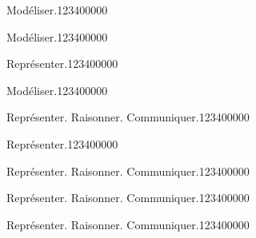 \begin{pageAD}
\begin{ExoCad}{Modéliser.}{1234}{0}{0}{0}{0}{0}
 
 
\end{ExoCad}

\begin{ExoCad}{Modéliser.}{1234}{0}{0}{0}{0}{0}

 
 
\end{ExoCad}

\begin{ExoCad}{Représenter.}{1234}{0}{0}{0}{0}{0}

 
 
\end{ExoCad}

\begin{ExoCad}{Modéliser.}{1234}{0}{0}{0}{0}{0}

 
 
\end{ExoCad}

\begin{ExoCad}{Représenter. Raisonner. Communiquer.}{1234}{0}{0}{0}{0}{0}

 
 
\end{ExoCad}

\begin{ExoCad}{Représenter.}{1234}{0}{0}{0}{0}{0}

 
 
\end{ExoCad}

\begin{ExoCad}{Représenter. Raisonner. Communiquer.}{1234}{0}{0}{0}{0}{0}

 
 
\end{ExoCad}

\begin{ExoCad}{Représenter. Raisonner. Communiquer.}{1234}{0}{0}{0}{0}{0}

 
 
\end{ExoCad}

\begin{ExoCad}{Représenter. Raisonner. Communiquer.}{1234}{0}{0}{0}{0}{0}

 
 
\end{ExoCad}



\end{pageAD}

